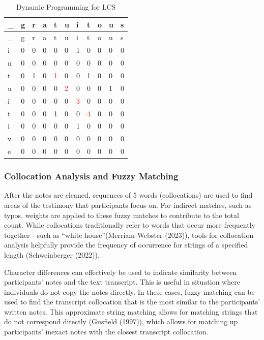 \documentclass[print]{nuthesis}
\begin{document}
\begin{longtable}[]{@{}lllllllllll@{}}
\caption{Dynamic Programming for LCS \label{tab:dylcs}}\tabularnewline
\toprule\noalign{}
\_ & g & r & a & t & u & i & t & o & u & s \\
\midrule\noalign{}
\endfirsthead
\toprule\noalign{}
\_ & g & r & a & t & u & i & t & o & u & s \\
\midrule\noalign{}
\endhead
\bottomrule\noalign{}
\endlastfoot
i & 0 & 0 & 0 & 0 & 0 & 1 & 0 & 0 & 0 & 0 \\
n & 0 & 0 & 0 & 0 & 0 & 0 & 0 & 0 & 0 & 0 \\
t & 0 & 1 & 0 & \textcolor{red}{1} & 0 & 0 & 1 & 0 & 0 & 0 \\
u & 0 & 0 & 0 & 0 & \textcolor{red}{2} & 0 & 0 & 0 & 1 & 0 \\
i & 0 & 0 & 0 & 0 & 0 & \textcolor{red}{3} & 0 & 0 & 0 & 0 \\
t & 0 & 0 & 0 & 1 & 0 & 0 & \textcolor{red}{4} & 0 & 0 & 0 \\
i & 0 & 0 & 0 & 0 & 0 & 1 & 0 & 0 & 0 & 0 \\
v & 0 & 0 & 0 & 0 & 0 & 0 & 0 & 0 & 0 & 0 \\
e & 0 & 0 & 0 & 0 & 0 & 0 & 0 & 0 & 0 & 0 \\
\end{longtable}

\hypertarget{collocation-analysis-and-fuzzy-matching}{%
\subsubsection{Collocation Analysis and Fuzzy Matching}\label{collocation-analysis-and-fuzzy-matching}}

After the notes are cleaned, sequences of 5 words (collocations) are used to find areas of the testimony that participants focus on.
For indirect matches, such as typos, weights are applied to these fuzzy matches to contribute to the total count.
While collocations traditionally refer to words that occur more frequently together - such as ``white house''(Merriam-Webster (2023)), tools for collocation analysis helpfully provide the frequency of occurrence for strings of a specified length (Schweinberger (2022)).

Character differences can effectively be used to indicate similarity between participants' notes and the text transcript.
This is useful in situation where individuals do not copy the notes directly.
In these cases, fuzzy matching can be used to find the transcript collocation that is the most similar to the participants' written notes.
This approximate string matching allows for matching strings that do not correspond directly (Gusfield (1997)), which allows for matching up participants' inexact notes with the closest transcript collocation.
\end{document}
